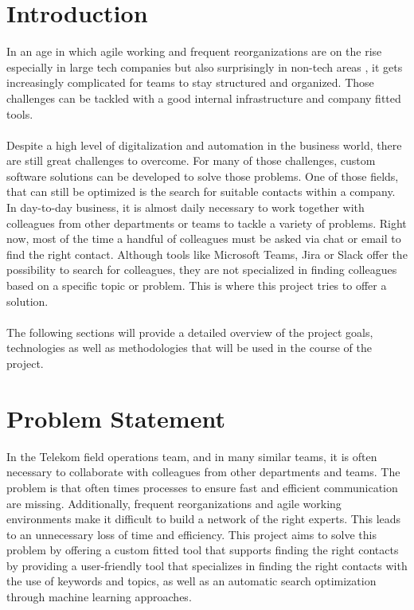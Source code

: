 \newpage
\section{Introduction}
In an age in which agile working and frequent reorganizations are on the rise 
especially in large tech companies but also surprisingly in non-tech areas \cite{noauthor_orgs_nodate}, it gets increasingly complicated for teams to stay structured 
and organized. Those challenges can be tackled with a good internal infrastructure 
and company fitted tools.
\\
\\
Despite a high level of digitalization and automation in the business world, there are still 
great challenges to overcome. For many of those challenges, custom software solutions can 
be developed to solve those problems. One of those fields, that can still be optimized is 
the search for suitable contacts within a company. In day-to-day business, it is almost 
daily necessary to work together with colleagues from other departments or teams to tackle 
a variety of problems. Right now, most of the time a handful of colleagues must be asked
via chat or email to find the right contact. Although tools like Microsoft Teams, Jira or 
Slack offer the possibility to search for colleagues, they are not specialized in finding colleagues
based on a specific topic or problem. This is where this project tries to offer a solution.\\
\\
The following sections will provide a detailed overview of the project goals, technologies as 
well as methodologies that will be used in the course of the project.

\section{Problem Statement}
In the Telekom field operations team, and in many similar teams, it is often necessary to collaborate
with colleagues from other departments and teams. The problem is that often times processes to ensure 
fast and efficient communication are missing. Additionally, frequent reorganizations and agile working 
environments make it difficult to build a network of the right experts. This leads to an unnecessary
loss of time and efficiency. This project aims to solve this problem by offering a custom fitted tool
that supports finding the right contacts by providing a user-friendly tool that specializes in finding 
the right contacts with the use of keywords and topics, as well as an automatic search optimization through
machine learning approaches.

